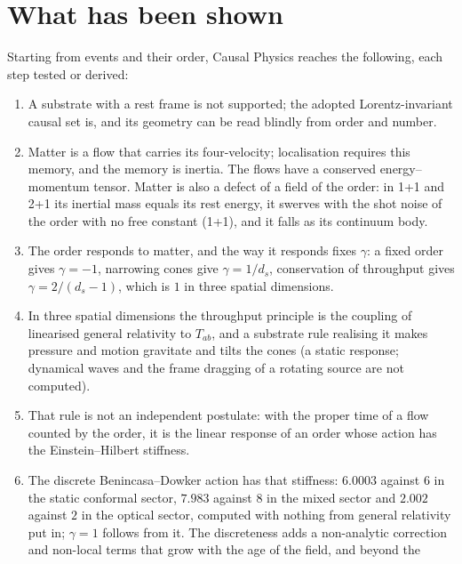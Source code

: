 
\section{What has been shown}\label{sec:shown}

Starting from events and their order, Causal Physics reaches the following, each step tested or derived:
\begin{enumerate}
\item A substrate with a rest frame is not supported; the adopted Lorentz-invariant causal set is, and its
  geometry can be read blindly from order and number.
\item Matter is a flow that carries its four-velocity; localisation requires this memory, and the memory is
  inertia. The flows have a conserved energy--momentum tensor. Matter is also a defect of a field of the order:
  in 1+1 and 2+1 its inertial mass equals its rest energy, it swerves with the shot noise of the order with no
  free constant (1+1), and it falls as its continuum body.
\item The order responds to matter, and the way it responds fixes $\gamma$: a fixed order gives
  $\gamma=-1$, narrowing cones give $\gamma=1/d_s$, conservation of throughput gives $\gamma=2/(d_s-1)$,
  which is $1$ in three spatial dimensions.
\item In three spatial dimensions the throughput principle is the coupling of linearised general relativity
  to $T_{ab}$, and a substrate rule realising it makes pressure and motion gravitate and tilts the cones (a static response; dynamical waves and the frame
  dragging of a rotating source are not computed).
\item That rule is not an independent postulate: with the proper time of a flow counted by the order, it is
  the linear response of an order whose action has the Einstein--Hilbert stiffness.
\item The discrete Benincasa--Dowker action has that stiffness: $6.0003$ against $6$ in the static
  conformal sector, $7.983$ against $8$ in the mixed sector and $2.002$ against $2$ in the optical
  sector, computed with nothing from general relativity put in; $\gamma=1$ follows from it. The discreteness
  adds a non-analytic correction and non-local terms that grow with the age of the field, and beyond the

\end{enumerate}
